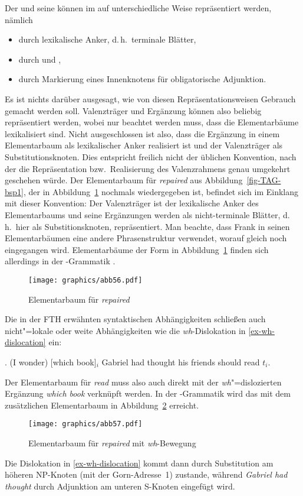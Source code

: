 Der  und seine  können im  auf unterschiedliche Weise repräsentiert werden, nämlich 
\begin{itemize}
  \item durch lexikalische Anker, d.\,h.\ terminale Blätter,
  \item durch  und ,
  \item durch Markierung eines Innenknotens für obligatorische Adjunktion.
\end{itemize}
Es ist nichts darüber ausgesagt, wie von diesen Repräsentationsweisen Gebrauch gemacht werden soll. Valenzträger und Ergänzung können also beliebig repräsentiert werden, wobei nur beachtet werden muss, dass die Elementarbäume lexikalisiert sind. Nicht ausgeschlossen ist also, dass die Ergänzung in einem Elementarbaum als lexikalischer Anker realisiert ist und der Valenzträger als Substitutionsknoten. Dies entspricht freilich nicht der üblichen Konvention, nach der die Repräsentation bzw.\ Realisierung des Valenzrahmens genau umgekehrt geschehen würde. Der Elementarbaum für {\it repaired} aus Abbildung~\ref{fig-TAG-bsp1}, der in Abbildung~\ref{fig-TAG-bsp1-1} nochmals wiedergegeben ist, befindet sich im Einklang mit dieser Konvention: Der Valenzträger ist der lexikalische Anker des Elementarbaums und seine Ergänzungen werden als nicht-terminale Blätter, d.\,h.\ hier als Substitionsknoten, repräsentiert. Man beachte, dass Frank in seinen Elementarbäumen eine andere Phrasenstruktur verwendet, worauf gleich noch eingegangen wird. Elementarbäume der Form in Abbildung~\ref{fig-TAG-bsp1-1} finden sich allerdings in der -Grammatik \citep{xtag:01}. 
\begin{figure}[t]
\centering
\texttt{[image: graphics/abb56.pdf]}
\caption{\label{fig-TAG-bsp1-1}Elementarbaum für {\it repaired}}
\end{figure}

Die in der FTH erwähnten syntaktischen Abhängigkeiten schlie\ss en auch nicht"=lokale oder weite Abhängigkeiten wie die \textit{wh}-Dislokation in \ref{ex-wh-dislocation} ein:

\ex. \label{ex-wh-dislocation}  (I wonder) [which book]$_i$ Gabriel had thought his friends should read $t_i$. \hfill \citep[25]{Frank:02}

Der Elementarbaum für {\it read} muss also auch direkt mit der \textit{wh}"=dislozierten Ergänzung {\it which book} verknüpft werden. In der -Grammatik wird das mit dem zusätzlichen Elementarbaum in Abbildung~\ref{fig-TAG-bsp1-2} erreicht. 
\begin{figure}[t]
\centering
\texttt{[image: graphics/abb57.pdf]}
\caption{\label{fig-TAG-bsp1-2}Elementarbaum für {\it repaired} mit \textit{wh}-Bewegung}
\end{figure}
Die Dislokation in \ref{ex-wh-dislocation} kommt dann durch Substitution am höheren NP-Knoten (mit der Gorn-Adresse~1) zustande, während \textit{Gabriel had thought} durch Adjunktion am unteren S-Knoten eingefügt wird.

